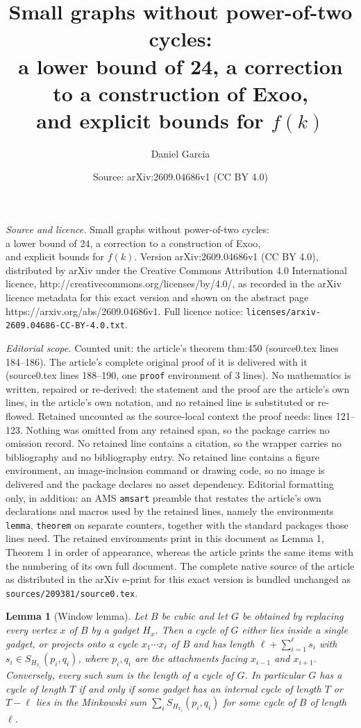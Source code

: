 \documentclass[10pt,a4paper]{amsart}
\title{Small graphs without power-of-two cycles:\\ a lower bound of 24, a correction to a construction of Exoo,\\ and explicit bounds for $f(k)$}
\author{Daniel Garcia}
\date{Source: arXiv:2609.04686v1 (CC BY 4.0)}
\newtheorem{lemma}{Lemma}
\begin{document}
\maketitle

\noindent\emph{Source and licence.} Small graphs without power-of-two cycles:\\ a lower bound of 24, a correction to a construction of Exoo,\\ and explicit bounds for $f(k)$. Version arXiv:2609.04686v1 (CC BY 4.0), distributed by arXiv under the Creative Commons Attribution 4.0 International licence, http://creativecommons.org/licenses/by/4.0/, as recorded in the arXiv licence metadata for this exact version and shown on the abstract page https://arxiv.org/abs/2609.04686v1. Full licence notice: \texttt{licenses/arxiv-2609.04686-CC-BY-4.0.txt}.\par\smallskip

\noindent\textit{Editorial scope.} Counted unit: the article's theorem thm:450 (source0.tex lines 184--186). The article's complete original proof of it is delivered with it (source0.tex lines 188--190, one \texttt{proof} environment of 3 lines). No mathematics is written, repaired or re-derived: the statement and the proof are the article's own lines, in the article's own notation, and no retained line is substituted or re-flowed.  Retained uncounted as the source-local context the proof needs: lines 121--123.  Nothing was omitted from any retained span, so the package carries no omission record.  No retained line contains a citation, so the wrapper carries no bibliography and no bibliography entry.  No retained line contains a figure environment, an image-inclusion command or drawing code, so no image is delivered and the package declares no asset dependency.  Editorial formatting only, in addition: an AMS \texttt{amsart} preamble that restates the article's own declarations and macros used by the retained lines, namely the environments \texttt{lemma}, \texttt{theorem} on separate counters, together with the standard packages those lines need.  The retained environments print in this document as Lemma 1, Theorem 1 in order of appearance, whereas the article prints the same items with the numbering of its own full document.  The complete native source of the article as distributed in the arXiv e-print for this exact version is bundled unchanged as \texttt{sources/209381/source0.tex}.
\begin{lemma}[Window lemma]\label{lem:window}
Let $B$ be cubic and let $G$ be obtained by replacing every vertex $x$ of $B$ by a gadget $H_x$. Then a cycle of $G$ either lies inside a single gadget, or projects onto a cycle $x_1\cdots x_\ell$ of $B$ and has length $\ell+\sum_{i=1}^{\ell}s_i$ with $s_i\in S_{H_{x_i}}(p_i,q_i)$, where $p_i,q_i$ are the attachments facing $x_{i-1}$ and $x_{i+1}$. Conversely, every such sum is the length of a cycle of $G$. In particular $G$ has a cycle of length $T$ if and only if some gadget has an internal cycle of length $T$ or $T-\ell$ lies in the Minkowski sum $\sum_i S_{H_{x_i}}(p_i,q_i)$ for some cycle of $B$ of length $\ell$.
\end{lemma}
\end{document}

